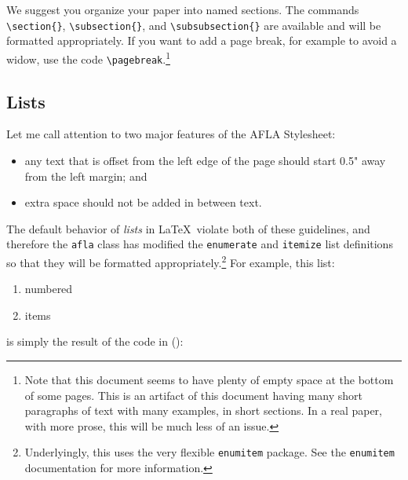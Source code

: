 \documentclass{afla}
\begin{document}
We suggest you organize your paper into named sections. The commands \verb`\section{}`, \verb`\subsection{}`, and \verb`\subsubsection{}` are available and will be formatted appropriately. If you want to add a page break, for example to avoid a widow, use the code \verb`\pagebreak`.\footnote{Note that this document seems to have plenty of empty space at the bottom of some pages. This is an artifact of this document having many short paragraphs of text with many examples, in short sections. In a real paper, with more prose, this will be much less of an issue.}

\subsection{Lists}

Let me call attention to two major features of the AFLA Stylesheet:

\begin{itemize}
\item any text that is offset from the left edge of the page should start 0.5" away from the left margin; and
\item extra space should not be added in between text.
\end{itemize}

\noindent The default behavior of \textit{lists} in \LaTeX\ violate both of these guidelines, and therefore the \verb`afla` class has modified the \verb`enumerate` and \verb`itemize` list definitions so that they will be formatted appropriately.\footnote{Underlyingly, this uses the very flexible \texttt{enumitem} package. See the \texttt{enumitem} documentation for more information.} For example, this list:

\begin{enumerate}
\item numbered
\item items
\end{enumerate}

\noindent is simply the result of the code in (\nextx):
\end{document}
